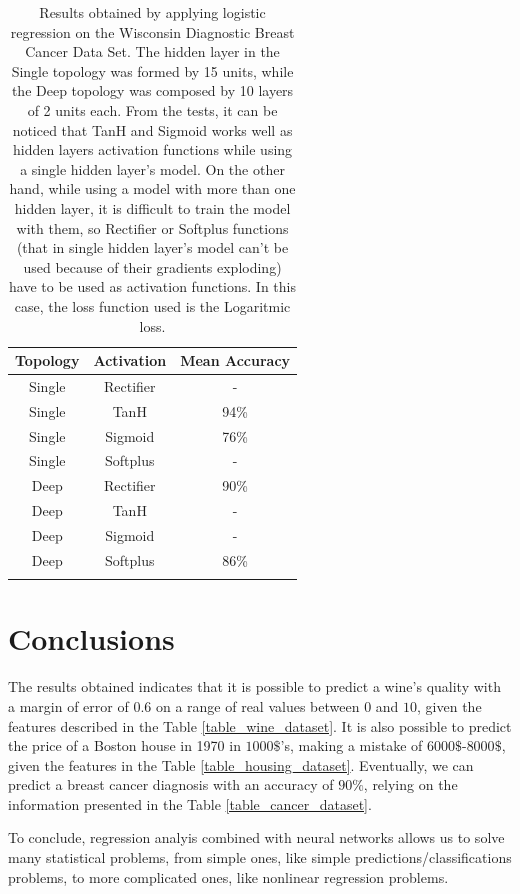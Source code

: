 \documentclass[10pt,journal,A4paper,compsoc,epsfig]{IEEEtran}
\begin{document}
\begin{table}
\centering
\begin{tabular}{c c c}
Topology & Activation & Mean Accuracy \\ 
\hline 
\noalign{\medskip}
Single & Rectifier & - \\ \noalign{\smallskip}
Single & TanH & 94\% \\ \noalign{\smallskip}
Single & Sigmoid & 76\% \\ \noalign{\smallskip}
Single & Softplus & - \\ \noalign{\smallskip}
Deep & Rectifier & 90\% \\ \noalign{\smallskip}
Deep & TanH & - \\ \noalign{\smallskip}
Deep & Sigmoid & - \\ \noalign{\smallskip}
Deep & Softplus & 86\% \\ \noalign{\smallskip}
\hline \noalign{\medskip}
\end{tabular}
\caption{Results obtained by applying logistic regression on the Wisconsin Diagnostic Breast Cancer Data Set. The hidden layer in the Single topology was formed by 15 units, while the Deep topology was composed by 10 layers of 2 units each. From the tests, it can be noticed that TanH and Sigmoid works well as hidden layers activation functions while using a single hidden layer's model. On the other hand, while using a model with more than one hidden layer, it is difficult to train the model with them, so Rectifier or Softplus functions (that in single hidden layer's model can't be used because of their gradients exploding) have to be used as activation functions. In this case, the loss function used is the Logaritmic loss.}
\label{table_results_cancer}
\end{table}%



\section{Conclusions}
The results obtained indicates that it is possible to predict a wine's quality with a margin of error of $0.6$ on a range of real values between $0$ and $10$, given the features described in the Table \ref{table_wine_dataset}. It is also possible to predict the price of a Boston house in 1970 in $1000\$$'s, making a mistake of  $6000\$$-$8000\$$, given the features in the Table \ref{table_housing_dataset}.  Eventually, we can predict a breast cancer diagnosis with an accuracy of $90\%$, relying on the information presented in the Table \ref{table_cancer_dataset}.

To conclude, regression analyis combined with neural networks allows us to solve many statistical problems, from simple ones, like simple predictions/classifications problems, to more complicated ones, like nonlinear regression problems.




\end{document}
